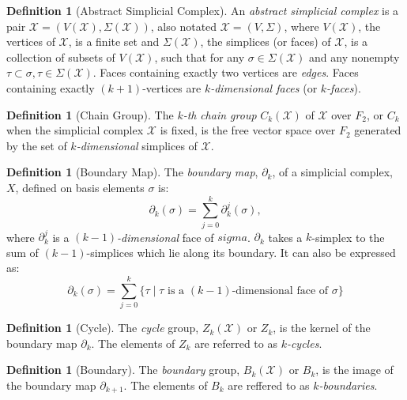 \documentclass[ma]{uncgdissertationexp}
\theoremstyle{plain}
\theoremstyle{definition}
\newtheorem{definition}[theorem]{Definition}
\theoremstyle{remark}
\begin{document}
\begin{definition}[Abstract Simplicial Complex]
\par An \textit{abstract simplicial complex} is a pair $\mathcal{X} = (V(\mathcal{X}), \Sigma(\mathcal{X}))$, also notated $\mathcal{X}=(V,\Sigma)$, where $V(\mathcal{X})$, the vertices of $\mathcal{X}$, is a finite set and $\Sigma(\mathcal{X})$, the simplices (or faces) of $\mathcal{X}$, is a collection of subsets of $V(\mathcal{X})$, such that for any $\sigma \in \Sigma(\mathcal{X})$ and any nonempty $\tau \subset \sigma, \tau \in \Sigma(\mathcal{X})$. Faces containing exactly two vertices are \textit{edges}. Faces containing exactly $(k+1)$-vertices are $k$\textit{-dimensional faces} (or $k$\textit{-faces}).
\end{definition}

\begin{definition}[Chain Group]
\par The $k$\textit{-th} \textit{chain group} $C_k(\mathcal{X})$ of $\mathcal{X}$ over $F_2$, or $C_k$ when the simplicial complex $\mathcal{\mathcal{X}}$ is fixed, is the free vector space over $F_2$ generated by the set of $k$\textit{-dimensional} simplices of $\mathcal{X}$.
\end{definition}

\begin{definition}[Boundary Map]
\par The \textit{boundary map}, $\partial_{k}$, of a simplicial complex, $X$, defined on basis elements $\sigma$ is:
$$\partial_{k}(\sigma)=\sum^{k}_{j=0}\partial^{j}_{k}(\sigma),$$
where $\partial^{j}_{k}$ is a $(k-1)$\textit{-dimensional} face of $sigma$. $\partial_{k}$ takes a $k$-simplex to the sum of $(k-1)$-simplices which lie along its boundary. It can also be expressed as:
$$\partial_{k}(\sigma)=\sum^{k}_{j=0}\big\{\tau \mid \tau \text{ is a }(k-1)\text{-dimensional face of } \sigma \big\}$$
\end{definition}

\begin{definition}[Cycle]
\par The \textit{cycle} group, $Z_{k}(\mathcal{X})$ or $Z_k$, is the kernel of the boundary map $\partial_{k}$. The elements of $Z_k$ are referred to as $k$\textit{-cycles}.
\end{definition}

\begin{definition}[Boundary]
\par The \textit{boundary} group, $B_{k}(\mathcal{X})$ or $B_k$, is the image of the boundary map $\partial_{k+1}$. The elements of $B_k$ are reffered to as $k$\textit{-boundaries}.
\end{definition}
\end{document}
